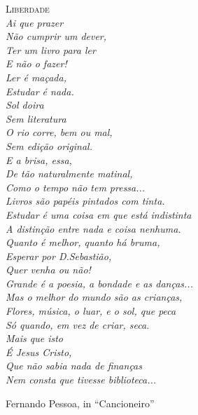 \begin{fullwidth}
{\noindent\LARGE\textsc{Liberdade}} \\

{\it
\noindent{}Ai que prazer \\
Não cumprir um dever, \\
Ter um livro para ler \\
E não o fazer! \\
Ler é maçada, \\
Estudar é nada. \\
Sol doira \\
Sem literatura \\
O rio corre, bem ou mal, \\
Sem edição original. \\
E a brisa, essa, \\
De tão naturalmente matinal, \\
Como o tempo não tem pressa... \\

\noindent{}Livros são papéis pintados com tinta. \\
Estudar é uma coisa em que está indistinta \\
A distinção entre nada e coisa nenhuma. \\

\noindent{}Quanto é melhor, quanto há bruma, \\
Esperar por D.Sebastião, \\
Quer venha ou não! \\

\noindent{}Grande é a poesia, a bondade e as danças... \\
Mas o melhor do mundo são as crianças, \\

\noindent{}Flores, música, o luar, e o sol, que peca \\
Só quando, em vez de criar, seca. \\

\noindent{}Mais que isto \\
É Jesus Cristo, \\
Que não sabia nada de finanças \\
Nem consta que tivesse biblioteca... \\
}

\noindent{}Fernando Pessoa, in ``Cancioneiro''

\end{fullwidth}

\thispagestyle{empty}
\clearpage

